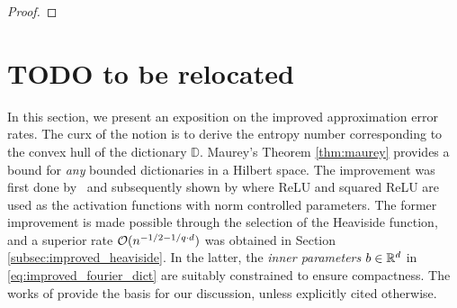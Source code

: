 \begin{proof}


\end{proof}


\section{TODO to be relocated}
\label{sec:improvement}


In this section, we present an exposition on the improved approximation error
rates. The curx of the notion is to derive the entropy number corresponding to
the convex hull of the dictionary $\mathbb{D}$. Maurey's Theorem
\ref{thm:maurey} provides a bound for \textit{any} bounded dictionaries in a
Hilbert space. The improvement was first done
by~\cite{makovozRandomApproximantsNeural1996} and subsequently shown by
\cite{klusowskiApproximationCombinationsReLU2018} where ReLU and squared ReLU
are used as the activation functions with norm controlled parameters. The former
improvement is made possible through the selection of the Heaviside function,
and a superior rate $\mathcal{O}(n^{-1/2 - 1/q\cdot d})$ was obtained in Section
\ref{subsec:improved_heaviside}. In the latter, the \textit{inner parameters}
$b\in\mathbb{R}^d$ in \eqref{eq:improved_fourier_dict} are suitably constrained to
ensure compactness. The works of \cite{maUniformApproximationRates2022,
siegelSharpBoundsApproximation2022, klusowskiApproximationCombinationsReLU2018a}
provide the basis for our discussion, unless explicitly cited otherwise.

